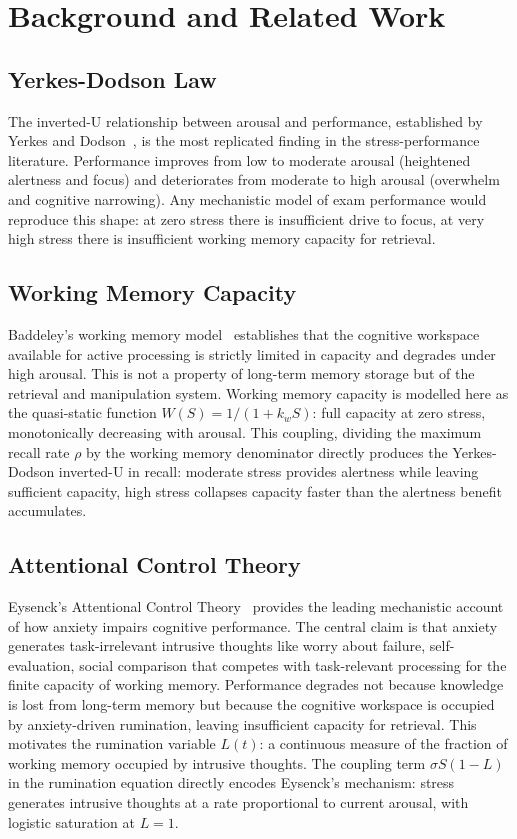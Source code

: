 \section{Background and Related Work}
\label{sec:bg}

\subsection{Yerkes-Dodson Law}

The inverted-U relationship between arousal and performance,
established by Yerkes and Dodson~\cite{yerkes1908}, is the most
replicated finding in the stress-performance literature. Performance
improves from low to moderate arousal (heightened alertness and
focus) and deteriorates from moderate to high arousal (overwhelm
and cognitive narrowing). Any mechanistic model of exam performance
would reproduce this shape: at zero stress there is insufficient
drive to focus, at very high stress there is insufficient working
memory capacity for retrieval.

\subsection{Working Memory Capacity}

Baddeley's working memory model~\cite{baddeley1986} establishes
that the cognitive workspace available for active processing is
strictly limited in capacity and degrades under high arousal. This
is not a property of long-term memory storage but of the retrieval
and manipulation system. Working memory capacity is modelled here
as the quasi-static function $W(S) = 1/(1+k_w S)$: full capacity
at zero stress, monotonically decreasing with arousal. This
coupling, dividing the maximum recall rate $\rho$ by the working
memory denominator directly produces the Yerkes-Dodson inverted-U
in recall: moderate stress provides alertness while leaving
sufficient capacity, high stress collapses capacity faster than
the alertness benefit accumulates.

\subsection{Attentional Control Theory}

Eysenck's Attentional Control Theory~\cite{eysenck2007} provides
the leading mechanistic account of how anxiety impairs cognitive
performance. The central claim is that anxiety generates
task-irrelevant intrusive thoughts like worry about failure,
self-evaluation, social comparison that competes with
task-relevant processing for the finite capacity of working memory.
Performance degrades not because knowledge is lost from long-term
memory but because the cognitive workspace is occupied by
anxiety-driven rumination, leaving insufficient capacity for
retrieval. This motivates the rumination variable $L(t)$: a
continuous measure of the fraction of working memory occupied by
intrusive thoughts. The coupling term $\sigma S(1-L)$ in the
rumination equation directly encodes Eysenck's mechanism: stress
generates intrusive thoughts at a rate proportional to current
arousal, with logistic saturation at $L=1$.

